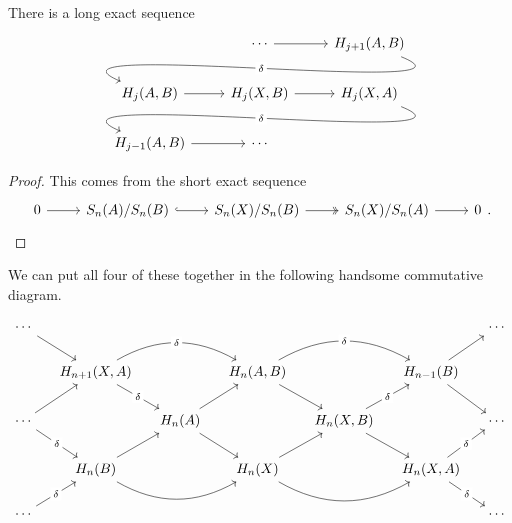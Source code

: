 \documentclass[main.tex]{subfiles}
\begin{document}
\begin{proposition}
  There is a long exact sequence
  \begin{equation*}
    \begin{tikzcd}
      & \cdots
      \arrow[r]
      & H_{j+1}(A, B)
      \\
      H_{j}(A, B)
      \arrow[from=urr, out=-22, in=157, looseness=1, overlay, "\delta" description]
      \arrow[r,]
      & H_{j}(X, B)
      \arrow[r,]
      & H_{j}(X, A)
      \\
      H_{j-1}(A, B)
      \arrow[r]
      \arrow[from=urr, out=-22, in=157, looseness=1, overlay, "\delta" description]
      & \cdots
    \end{tikzcd}
  \end{equation*}
\end{proposition}
\begin{proof}
  This comes from the short exact sequence
  \begin{equation*}
    \begin{tikzcd}
      0
      \arrow[r]
      & S_{n}(A)/S_{n}(B)
      \arrow[r, hook]
      & S_{n}(X)/S_{n}(B)
      \arrow[r, two heads]
      & S_{n}(X)/S_{n}(A)
      \arrow[r]
      & 0
    \end{tikzcd}.
  \end{equation*}
\end{proof}

We can put all four of these together in the following handsome commutative diagram.

\begin{equation*}
  \begin{tikzcd}[column sep=small]
    \cdots
    \arrow[dr]
    &&&&&& \cdots
    \\
    & H_{n+1}(X, A)
    \arrow[rr, bend left, overlay, "\delta" description]
    \arrow[dr, "\delta" description]
    && H_{n}(A, B)
    \arrow[rr, bend left, overlay, "\delta" description]
    \arrow[dr]
    && H_{n-1}(B)
    \arrow[ur]
    \arrow[dr]
    \\
    \cdots
    \arrow[ur]
    \arrow[dr, "\delta" description]
    && H_{n}(A)
    \arrow[ur]
    \arrow[dr]
    && H_{n}(X, B)
    \arrow[ur, "\delta" description]
    \arrow[dr]
    && \cdots
    \\
    & H_{n}(B)
    \arrow[rr, bend right]
    \arrow[ur]
    && H_{n}(X)
    \arrow[rr, bend right]
    \arrow[ur]
    && H_{n}(X, A)
    \arrow[ur, "\delta" description]
    \arrow[dr, "\delta" description]
    \\
    \cdots
    \arrow[ur, "\delta" description]
    &&&&&& \cdots
  \end{tikzcd}
\end{equation*}
\end{document}

